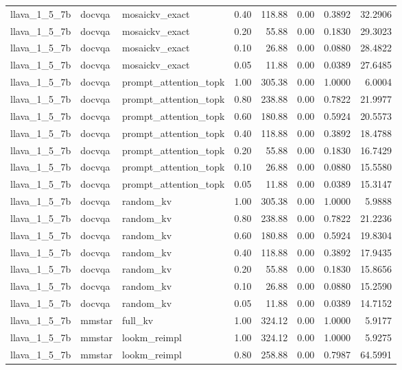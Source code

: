 \begin{longtable}{lllrrrrr}
llava\_1\_5\_7b & docvqa & mosaickv\_exact & 0.40 & 118.88 & 0.00 & 0.3892 & 32.2906 \\
llava\_1\_5\_7b & docvqa & mosaickv\_exact & 0.20 & 55.88 & 0.00 & 0.1830 & 29.3023 \\
llava\_1\_5\_7b & docvqa & mosaickv\_exact & 0.10 & 26.88 & 0.00 & 0.0880 & 28.4822 \\
llava\_1\_5\_7b & docvqa & mosaickv\_exact & 0.05 & 11.88 & 0.00 & 0.0389 & 27.6485 \\
llava\_1\_5\_7b & docvqa & prompt\_attention\_topk & 1.00 & 305.38 & 0.00 & 1.0000 & 6.0004 \\
llava\_1\_5\_7b & docvqa & prompt\_attention\_topk & 0.80 & 238.88 & 0.00 & 0.7822 & 21.9977 \\
llava\_1\_5\_7b & docvqa & prompt\_attention\_topk & 0.60 & 180.88 & 0.00 & 0.5924 & 20.5573 \\
llava\_1\_5\_7b & docvqa & prompt\_attention\_topk & 0.40 & 118.88 & 0.00 & 0.3892 & 18.4788 \\
llava\_1\_5\_7b & docvqa & prompt\_attention\_topk & 0.20 & 55.88 & 0.00 & 0.1830 & 16.7429 \\
llava\_1\_5\_7b & docvqa & prompt\_attention\_topk & 0.10 & 26.88 & 0.00 & 0.0880 & 15.5580 \\
llava\_1\_5\_7b & docvqa & prompt\_attention\_topk & 0.05 & 11.88 & 0.00 & 0.0389 & 15.3147 \\
llava\_1\_5\_7b & docvqa & random\_kv & 1.00 & 305.38 & 0.00 & 1.0000 & 5.9888 \\
llava\_1\_5\_7b & docvqa & random\_kv & 0.80 & 238.88 & 0.00 & 0.7822 & 21.2236 \\
llava\_1\_5\_7b & docvqa & random\_kv & 0.60 & 180.88 & 0.00 & 0.5924 & 19.8304 \\
llava\_1\_5\_7b & docvqa & random\_kv & 0.40 & 118.88 & 0.00 & 0.3892 & 17.9435 \\
llava\_1\_5\_7b & docvqa & random\_kv & 0.20 & 55.88 & 0.00 & 0.1830 & 15.8656 \\
llava\_1\_5\_7b & docvqa & random\_kv & 0.10 & 26.88 & 0.00 & 0.0880 & 15.2590 \\
llava\_1\_5\_7b & docvqa & random\_kv & 0.05 & 11.88 & 0.00 & 0.0389 & 14.7152 \\
llava\_1\_5\_7b & mmstar & full\_kv & 1.00 & 324.12 & 0.00 & 1.0000 & 5.9177 \\
llava\_1\_5\_7b & mmstar & lookm\_reimpl & 1.00 & 324.12 & 0.00 & 1.0000 & 5.9275 \\
llava\_1\_5\_7b & mmstar & lookm\_reimpl & 0.80 & 258.88 & 0.00 & 0.7987 & 64.5991 \\

\end{longtable}
